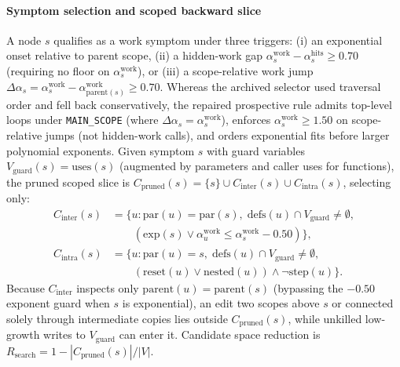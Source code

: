 \paragraph{Symptom selection and scoped backward slice}
A node $s$ qualifies as a work symptom under three triggers: (i) an exponential onset relative to parent scope, (ii) a hidden-work gap $\alpha_s^{\mathrm{work}} - \alpha_s^{\mathrm{hits}} \ge 0.70$ (requiring no floor on $\alpha_s^{\mathrm{work}}$), or (iii) a scope-relative work jump $\Delta \alpha_s = \alpha_s^{\mathrm{work}} - \alpha_{\mathrm{parent}(s)}^{\mathrm{work}} \ge 0.70$. Whereas the archived selector used traversal order and fell back conservatively, the repaired prospective rule admits top-level loops under \texttt{MAIN\_SCOPE} (where $\Delta\alpha_s = \alpha_s^{\mathrm{work}}$), enforces $\alpha_s^{\mathrm{work}} \ge 1.50$ on scope-relative jumps (not hidden-work calls), and orders exponential fits before larger polynomial exponents. Given symptom $s$ with guard variables $V_{\mathrm{guard}}(s) = \mathrm{uses}(s)$ (augmented by parameters and caller uses for functions), the pruned scoped slice is $C_{\mathrm{pruned}}(s) = \{s\} \cup C_{\mathrm{inter}}(s) \cup C_{\mathrm{intra}}(s)$, selecting only:
\begin{align}
C_{\mathrm{inter}}(s) &= \bigl\{u : \mathrm{par}(u)=\mathrm{par}(s),\; \mathrm{defs}(u)\cap V_{\mathrm{guard}} \neq \emptyset, \nonumber\\
&\qquad (\mathrm{exp}(s) \lor \alpha_u^{\mathrm{work}} \le \alpha_s^{\mathrm{work}} - 0.50)\bigr\},\\
C_{\mathrm{intra}}(s) &= \bigl\{u : \mathrm{par}(u)=s,\; \mathrm{defs}(u)\cap V_{\mathrm{guard}} \neq \emptyset, \nonumber\\
&\qquad (\mathrm{reset}(u) \lor \mathrm{nested}(u)) \land \neg\mathrm{step}(u)\bigr\}.
\end{align}
Because $C_{\mathrm{inter}}$ inspects only $\mathrm{parent}(u) = \mathrm{parent}(s)$ (bypassing the $-0.50$ exponent guard when $s$ is exponential), an edit two scopes above $s$ or connected solely through intermediate copies lies outside $C_{\mathrm{pruned}}(s)$, while unkilled low-growth writes to $V_{\mathrm{guard}}$ can enter it. Candidate space reduction is $R_{\mathrm{search}} = 1 - |C_{\mathrm{pruned}}(s)|/|V|$.

